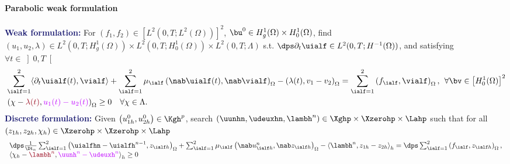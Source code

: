\begin{frame}
\begin{overprint}
\vspace{0.1 cm}
\textcolor{cadmiumgreen}{\textbf{Parabolic weak formulation}}
\\\\
\textcolor{midnightblue}{\textbf{Weak formulation:}} 
For $\left(f_1,f_2\right) \in  [L^2(0,T;L^2(\Omega))]^2$, $\bu^0 \in H_g^1(\Omega) \times H_0^1(\Omega)$, 
find  $(u_1,u_2,\lambda) \in L^2(0,T;H_g^1(\Omega)) \times L^2(0,T;H_0^1(\Omega)) \times L^2(0,T; \Lambda)$ s.t. $\dps \partial_t \uialf \in L^2(0,T;H^{-1}(\Omega))$, and satisfying $\forall t \in \left]0,T\right[$ 
\begin{equation*}
\vspace{-0.2 cm}
\begin{split}
&\sum_{\ialf=1}^2 \langle \partial_t \uialf(t), \vialf \rangle + \sum_{\ialf=1}^2 \mu_\ialf \left(\nab \uialf(t), \nab \vialf \right)_{\Omega} - \left(\lambda(t),v_1-v_2\right)_{\Omega} = \sum_{\ialf=1}^2 \left(f_\ialf, \vialf \right)_{\Omega}, \hspace{0.15 cm} \forall \bv \in \left[H_0^1(\Omega)\right]^2 \\
& \left(\chi-\textcolor{carmine}{\lambda(t)}, \textcolor{electricpurple}{u_1(t)-u_2(t)}\right)_{\Omega} \geq 0 \quad \forall \chi \in \Lambda.
\end{split}
\end{equation*}
\textcolor{midnightblue}{\textbf{Discrete formulation:}}
Given $\left(u_{1h}^0,u_{2h}^0 \right) \in \Kgh^{p}$, search $(\uunhn,\udeuxhn,\lambh^n)\in \Xghp \times \Xzerohp \times
\Lahp$ such that for all $\left(z_{1h},z_{2h},\chi_h\right) \in \Xzerohp \times \Xzerohp \times \Lahp$ 
\begin{equation*}
\begin{array}{lcl}
\dps \frac{1}{\Dt_n} \sum_{\ialf=1}^2 \left(\uialfhn-\uialfh^{n-1}, z_{\ialf h}\right)_{\Omega} + \sum_{\ialf=1}^2 \mu_\ialf \left(\nab u_{\ialf h}^n, \nab z_{\ialf h}\right)_{\Omega}
- \left\langle \lambh^n, z_{1h}-z_{2h} \right \rangle_h
=  \dps \sum_{\ialf=1}^2 \left(f_\ialf,z_{\ialf h}\right)_{\Omega}, \\
\left\langle \chi_h - \textcolor{carmine}{\lambh^n}, \textcolor{electricpurple}{\uunh^n - \udeuxh^n}\right \rangle_h   \geq 0 
\end{array}
\end{equation*}


\end{overprint}
\end{frame}
